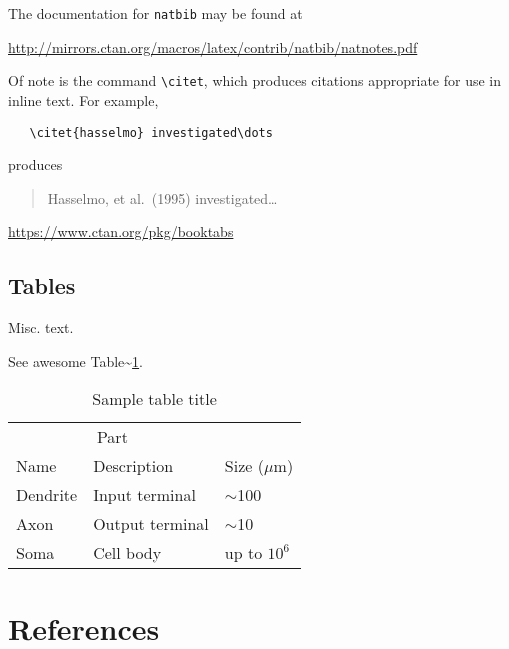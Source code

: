 \documentclass{article}
\begin{document}
\label{sec:others}

The documentation for \verb+natbib+ may be found at

\begin{center}
  \url{http://mirrors.ctan.org/macros/latex/contrib/natbib/natnotes.pdf}
\end{center}

Of note is the command \verb+\citet+, which produces citations
appropriate for use in inline text. For example,

\begin{verbatim}
   \citet{hasselmo} investigated\dots
\end{verbatim}

produces

\begin{quote}
  Hasselmo, et al.\ (1995) investigated\dots
\end{quote}

\begin{center}
  \url{https://www.ctan.org/pkg/booktabs}
\end{center}

\hypertarget{tables}{%
\subsection{Tables}\label{tables}}

Misc. text.

See awesome Table\textasciitilde{}\ref{tab:table}.

\begin{table}
 \caption{Sample table title}
  \centering
  \begin{tabular}{lll}
    \toprule
    \multicolumn{2}{c}{Part}                   \\
    \cmidrule(r){1-2}
    Name     & Description     & Size ($\mu$m) \\
    \midrule
    Dendrite & Input terminal  & $\sim$100     \\
    Axon     & Output terminal & $\sim$10      \\
    Soma     & Cell body       & up to $10^6$  \\
    \bottomrule
  \end{tabular}
  \label{tab:table}
\end{table}

\newpage

\hypertarget{references}{%
\section*{References}\label{references}}
\end{document}
